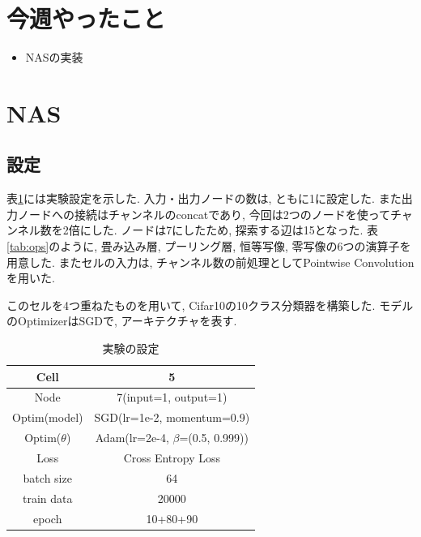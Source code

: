 \documentclass[twocolumn]{jarticle}     %
\begin{document}


\section{今週やったこと}
\begin{itemize}
	\item {NASの実装}
\end{itemize}

\section{NAS}
\subsection{設定}
表\ref{tab:setting}には実験設定を示した.
入力・出力ノードの数は, ともに1に設定した.
また出力ノードへの接続はチャンネルのconcatであり, 今回は2つのノードを使ってチャンネル数を2倍にした.
ノードは7にしたため, 探索する辺は15となった.
表\ref{tab:ops}のように, 畳み込み層, プーリング層, 恒等写像, 零写像の6つの演算子を用意した.
またセルの入力は, チャンネル数の前処理としてPointwise Convolutionを用いた.

このセルを4つ重ねたものを用いて, Cifar10の10クラス分類器を構築した.
モデルのOptimizerはSGDで, アーキテクチャを表す.

\begin{table}[tb]
  \begin{center}
    \caption{実験の設定}
    \begin{tabular}{|c|c|} \hline
      Cell & 5 \\ \hline
      Node & 7(input=1, output=1) \\ \hline
      Optim(model) & SGD(lr=1e-2, momentum=0.9) \\ \hline
      Optim($\theta$) & Adam(lr=2e-4, $\beta$=(0.5, 0.999)) \\ \hline
      Loss & Cross Entropy Loss \\ \hline
      batch size & 64 \\ \hline
      train data & 20000 \\ \hline
      epoch & 10+80+90 \\ \hline
    \end{tabular}
    \label{tab:setting}
  \end{center}
\end{table}
\end{document}
